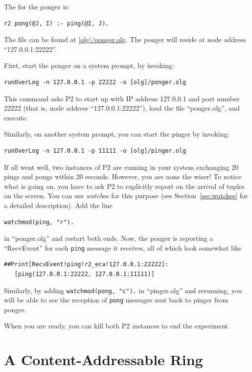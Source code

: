 \documentclass{article}
\begin{document}
The \ol for the ponger is:
\begin{lstlisting}
r2 pong(@J, I) :- ping(@I, J).
\end{lstlisting}
The file can be found at \url{[olg]/ponger.olg}. The ponger will reside at
node address ``127.0.0.1:22222''.

First, start the ponger on a system prompt, by invoking:
\begin{verbatim}
runOverLog -n 127.0.0.1 -p 22222 -o [olg]/ponger.olg 
\end{verbatim}
This command asks P2 to start up with IP address 127.0.0.1 and port
number 22222 (that is, node address ``127.0.0.1:22222''), load the
\ol file ``ponger.olg'', and execute.

Similarly, on another system prompt, you can start the pinger by
invoking:
\begin{verbatim}
runOverLog -n 127.0.0.1 -p 11111 -o [olg]/pinger.olg 
\end{verbatim}

If all went well, two instances of P2 are running in your system
exchanging 20 pings and pongs within 20 seconds. However, you are none
the wiser!  To notice what is going on, you have to ask P2 to explicitly
report on the arrival of tuples on the screen.  You can use
\emph{watch}es for this purpose (see Section~\ref{sec:watches} for
a detailed description).  Add the line
\begin{lstlisting}
watchmod(ping, "r").
\end{lstlisting}
in ``ponger.olg'' and restart both ends.  Now, the ponger is reporting a
``RecvEvent'' for each \lstinline$ping$ message it receives, all of
which look somewhat like
\begin{verbatim}
##Print[RecvEvent!ping!r2_eca!127.0.0.1:22222]:
   [ping(127.0.0.1:22222, 127.0.0.1:11111)]
\end{verbatim}

Similarly, by adding \lstinline$watchmod(pong, "c").$ in ``pinger.olg''
and rerunning, you will be able to see the reception of \lstinline$pong$
messages sent back to pinger from ponger.

When you are ready, you can kill both P2 instances to end the
experiment.





\section{A Content-Addressable Ring}
\end{document}
